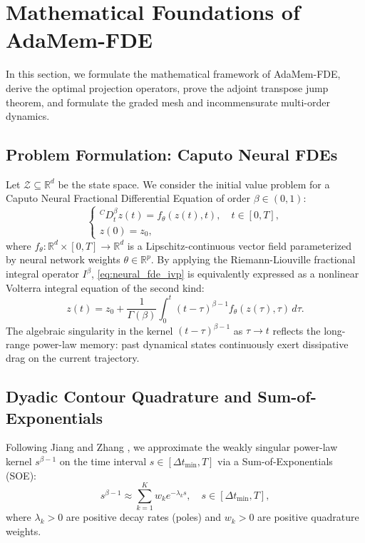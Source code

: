 \documentclass[11pt,a4paper]{article}
\theoremstyle{plain}
\theoremstyle{definition}
\newcommand{\R}{\mathbb{R}}
\newcommand{\cD}{{}^C D}
\newcommand{\dt}{\Delta t}
\begin{document}
\section{Mathematical Foundations of AdaMem-FDE}
\label{sec:math_foundations}

In this section, we formulate the mathematical framework of AdaMem-FDE, derive the optimal projection operators, prove the adjoint transpose jump theorem, and formulate the graded mesh and incommensurate multi-order dynamics.

\subsection{Problem Formulation: Caputo Neural FDEs}
Let $\mathcal{Z} \subseteq \R^d$ be the state space. We consider the initial value problem for a Caputo Neural Fractional Differential Equation of order $\beta \in (0, 1)$:
\begin{equation}
    \begin{cases}
        \cD_t^\beta z(t) = f_\theta(z(t), t), \quad t \in [0, T], \\
        z(0) = z_0,
    \end{cases}
    \label{eq:neural_fde_ivp}
\end{equation}
where $f_\theta: \R^d \times [0, T] \to \R^d$ is a Lipschitz-continuous vector field parameterized by neural network weights $\theta \in \R^p$. By applying the Riemann-Liouville fractional integral operator $I^\beta$, \cref{eq:neural_fde_ivp} is equivalently expressed as a nonlinear Volterra integral equation of the second kind:
\begin{equation}
    z(t) = z_0 + \frac{1}{\Gamma(\beta)} \int_0^t (t - \tau)^{\beta - 1} f_\theta(z(\tau), \tau) \, d\tau.
    \label{eq:volterra_integral}
\end{equation}
The algebraic singularity in the kernel $(t - \tau)^{\beta - 1}$ as $\tau \to t$ reflects the long-range power-law memory: past dynamical states continuously exert dissipative drag on the current trajectory.

\subsection{Dyadic Contour Quadrature and Sum-of-Exponentials}
Following Jiang and Zhang \cite{jiang2017fast}, we approximate the weakly singular power-law kernel $s^{\beta - 1}$ on the time interval $s \in [\dt_{\min}, T]$ via a Sum-of-Exponentials (SOE):
\begin{equation}
    s^{\beta - 1} \approx \sum_{k=1}^K w_k e^{-\lambda_k s}, \quad s \in [\dt_{\min}, T],
    \label{eq:soe_approximation}
\end{equation}
where $\lambda_k > 0$ are positive decay rates (poles) and $w_k > 0$ are positive quadrature weights. 
\end{document}
